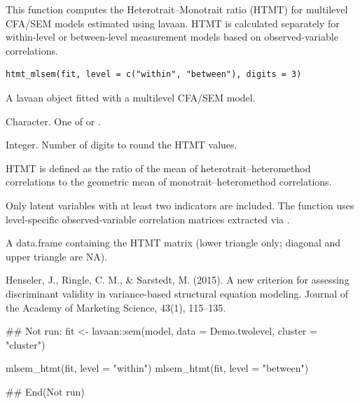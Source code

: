 \documentclass[a4paper]{book}
\begin{document}
%
\begin{Description}
This function computes the Heterotrait–Monotrait ratio (HTMT)
for multilevel CFA/SEM models estimated using lavaan.
HTMT is calculated separately for within-level or between-level
measurement models based on observed-variable correlations.
\end{Description}
%
\begin{Usage}
\begin{verbatim}
htmt_mlsem(fit, level = c("within", "between"), digits = 3)
\end{verbatim}
\end{Usage}
%
\begin{Arguments}
\begin{ldescription}
\item[\code{fit}] A lavaan object fitted with a multilevel CFA/SEM model.

\item[\code{level}] Character. One of  or .

\item[\code{digits}] Integer. Number of digits to round the HTMT values.
\end{ldescription}
\end{Arguments}
%
\begin{Details}
HTMT is defined as the ratio of the mean of heterotrait–heteromethod
correlations to the geometric mean of monotrait–heteromethod
correlations.

Only latent variables with at least two indicators are included.
The function uses level-specific observed-variable correlation
matrices extracted via .
\end{Details}
%
\begin{Value}
A data.frame containing the HTMT matrix
(lower triangle only; diagonal and upper triangle are NA).
\end{Value}
%
\begin{References}
Henseler, J., Ringle, C. M., \& Sarstedt, M. (2015).
A new criterion for assessing discriminant validity in
variance-based structural equation modeling.
Journal of the Academy of Marketing Science, 43(1), 115–135.
\end{References}
%
\begin{Examples}
\begin{ExampleCode}
## Not run: 
fit <- lavaan::sem(model, data = Demo.twolevel, cluster = "cluster")

mlsem_htmt(fit, level = "within")
mlsem_htmt(fit, level = "between")

## End(Not run)
\end{ExampleCode}
\end{Examples}
\end{document}
